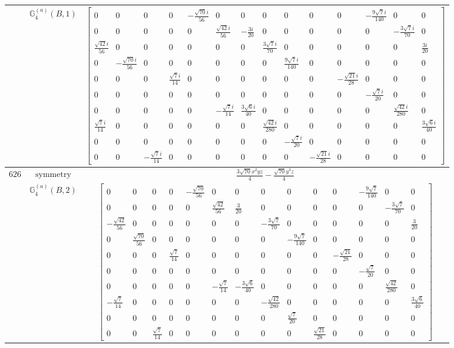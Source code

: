 \documentclass[fleqn,8pt,landscape]{jsarticle}
\begin{document}
\begin{longtable}{ccc}
$  $ & $ \mathbb{G}_{4}^{(a)}(B,1) $ & $ \begin{bmatrix} 0 & 0 & 0 & 0 & - \frac{\sqrt{70} i}{56} & 0 & 0 & 0 & 0 & 0 & 0 & - \frac{9 \sqrt{7} i}{140} & 0 & 0 \\ 0 & 0 & 0 & 0 & 0 & \frac{\sqrt{42} i}{56} & - \frac{3 i}{20} & 0 & 0 & 0 & 0 & 0 & - \frac{3 \sqrt{7} i}{70} & 0 \\ \frac{\sqrt{42} i}{56} & 0 & 0 & 0 & 0 & 0 & 0 & \frac{3 \sqrt{7} i}{70} & 0 & 0 & 0 & 0 & 0 & \frac{3 i}{20} \\ 0 & - \frac{\sqrt{70} i}{56} & 0 & 0 & 0 & 0 & 0 & 0 & \frac{9 \sqrt{7} i}{140} & 0 & 0 & 0 & 0 & 0 \\ 0 & 0 & 0 & \frac{\sqrt{7} i}{14} & 0 & 0 & 0 & 0 & 0 & 0 & - \frac{\sqrt{21} i}{28} & 0 & 0 & 0 \\ 0 & 0 & 0 & 0 & 0 & 0 & 0 & 0 & 0 & 0 & 0 & - \frac{\sqrt{7} i}{20} & 0 & 0 \\ 0 & 0 & 0 & 0 & 0 & - \frac{\sqrt{7} i}{14} & \frac{3 \sqrt{6} i}{40} & 0 & 0 & 0 & 0 & 0 & \frac{\sqrt{42} i}{280} & 0 \\ \frac{\sqrt{7} i}{14} & 0 & 0 & 0 & 0 & 0 & 0 & \frac{\sqrt{42} i}{280} & 0 & 0 & 0 & 0 & 0 & \frac{3 \sqrt{6} i}{40} \\ 0 & 0 & 0 & 0 & 0 & 0 & 0 & 0 & - \frac{\sqrt{7} i}{20} & 0 & 0 & 0 & 0 & 0 \\ 0 & 0 & - \frac{\sqrt{7} i}{14} & 0 & 0 & 0 & 0 & 0 & 0 & - \frac{\sqrt{21} i}{28} & 0 & 0 & 0 & 0 \end{bmatrix} $ \\ \hline
$ 626 $ & $ \text{symmetry} $ & $ \frac{3 \sqrt{70} x^{2} y z}{4} - \frac{\sqrt{70} y^{3} z}{4} $ \\
$  $ & $ \mathbb{G}_{4}^{(a)}(B,2) $ & $ \begin{bmatrix} 0 & 0 & 0 & 0 & - \frac{\sqrt{70}}{56} & 0 & 0 & 0 & 0 & 0 & 0 & - \frac{9 \sqrt{7}}{140} & 0 & 0 \\ 0 & 0 & 0 & 0 & 0 & \frac{\sqrt{42}}{56} & \frac{3}{20} & 0 & 0 & 0 & 0 & 0 & - \frac{3 \sqrt{7}}{70} & 0 \\ - \frac{\sqrt{42}}{56} & 0 & 0 & 0 & 0 & 0 & 0 & - \frac{3 \sqrt{7}}{70} & 0 & 0 & 0 & 0 & 0 & \frac{3}{20} \\ 0 & \frac{\sqrt{70}}{56} & 0 & 0 & 0 & 0 & 0 & 0 & - \frac{9 \sqrt{7}}{140} & 0 & 0 & 0 & 0 & 0 \\ 0 & 0 & 0 & \frac{\sqrt{7}}{14} & 0 & 0 & 0 & 0 & 0 & 0 & - \frac{\sqrt{21}}{28} & 0 & 0 & 0 \\ 0 & 0 & 0 & 0 & 0 & 0 & 0 & 0 & 0 & 0 & 0 & - \frac{\sqrt{7}}{20} & 0 & 0 \\ 0 & 0 & 0 & 0 & 0 & - \frac{\sqrt{7}}{14} & - \frac{3 \sqrt{6}}{40} & 0 & 0 & 0 & 0 & 0 & \frac{\sqrt{42}}{280} & 0 \\ - \frac{\sqrt{7}}{14} & 0 & 0 & 0 & 0 & 0 & 0 & - \frac{\sqrt{42}}{280} & 0 & 0 & 0 & 0 & 0 & \frac{3 \sqrt{6}}{40} \\ 0 & 0 & 0 & 0 & 0 & 0 & 0 & 0 & \frac{\sqrt{7}}{20} & 0 & 0 & 0 & 0 & 0 \\ 0 & 0 & \frac{\sqrt{7}}{14} & 0 & 0 & 0 & 0 & 0 & 0 & \frac{\sqrt{21}}{28} & 0 & 0 & 0 & 0 \end{bmatrix} $ \\ \hline

\end{longtable}
\end{document}
